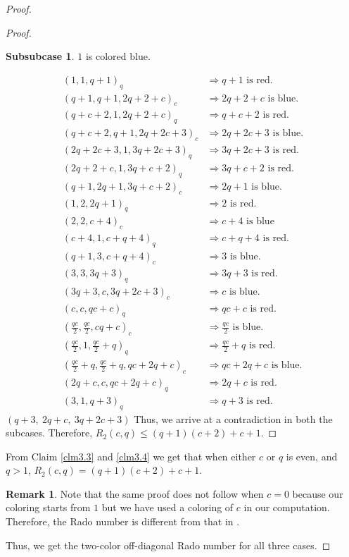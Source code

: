 \documentclass[preprint,12pt]{elsarticle}
\theoremstyle{plain}
\theoremstyle{definition}
\newtheorem{rem}[thm]{Remark}
\newtheorem{subsubcase}{Subsubcase}[subcase]
\begin{document}
\begin{proof}
\begin{proof}
\begin{subsubcase}
    $1$ is colored blue.
\end{subsubcase}
\begingroup
\setlength{\jot}{2pt}
\begin{align*}
(1,1,q+1)_q&\Longrightarrow q+1 \text{ is red.}\\
(q+1,q+1,2q+2+c)_c&\Longrightarrow 2q+2+c \text{ is blue.}\\
(q+c+2,1,2q+2+c)_q&\Longrightarrow q+c+2 \text{ is red.}\\
(q+c+2,q+1,2q+2c+3)_c&\Longrightarrow 2q+2c+3 \text{ is blue.}\\
(2q+2c+3,1,3q+2c+3)_q&\Longrightarrow 3q+2c+3 \text{ is red.}\\
(2q+2+c,1,3q+c+2)_q&\Longrightarrow 3q+c+2 \text{ is red.}\\
(q+1,2q+1,3q+c+2)_c&\Longrightarrow 2q+1 \text{ is blue.}\\
(1,2,2q+1)_q&\Longrightarrow 2 \text{ is red.}\\
(2,2,c+4)_c&\Longrightarrow c+4 \text{ is blue}\\
(c+4,1,c+q+4)_q&\Longrightarrow c+q+4 \text{ is red.}\\
(q+1,3,c+q+4)_c&\Longrightarrow 3 \text{ is blue.}\\
(3,3,3q+3)_q&\Longrightarrow 3q+3 \text{ is red.}\\
(3q+3,c,3q+2c+3)_c&\Longrightarrow c \text{ is blue.}\\
(c,c,qc+c)_q&\Longrightarrow qc+c \text{ is red.}\\
(\tfrac{qc}{2},\tfrac{qc}{2},cq+c)_c&\Longrightarrow \tfrac{qc}{2} \text{ is blue.}\\
(\tfrac{qc}{2},1,\tfrac{qc}{2}+q)_q&\Longrightarrow \tfrac{qc}{2}+q \text{ is red.}\\
(\tfrac{qc}{2}+q,\tfrac{qc}{2}+q,qc+2q+c)_c&\Longrightarrow qc+2q+c \text{ is blue.}\\
(2q+c,c,qc+2q+c)_q&\Longrightarrow 2q+c \text{ is red.}\\
(3,1,q+3)_q&\Longrightarrow q+3 \text{ is red.}
\end{align*}
$(q+3,\ 2q+c,\ 3q+2c+3)$
\endgroup
Thus, we arrive at a contradiction in both the subcases. Therefore, $R_2(c,q) \leq (q+1)(c+2)+c+1$. \end{proof}

From Claim \ref{clm3.3} and \ref{clm3.4} we get that when either $c$ or $q$ is even, and $q >1$, $R_2(c,q) = (q+1)(c+2)+c+1$.
\begin{rem}
Note that the same proof does not follow when $c=0$ because our coloring starts from $1$ but we have used a coloring of $c$ in our computation. Therefore, the Rado number is different from that in \cite{myers2006two}.
\end{rem}

\vspace{2mm}
Thus, we get the two-color off-diagonal Rado number for all three cases. \end{proof}
\end{document}
